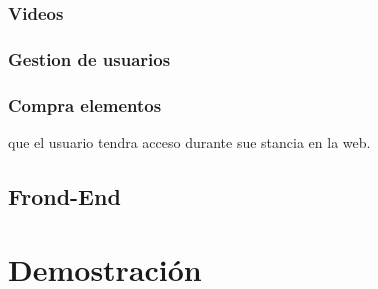 \subsubsection*{Videos}

\subsubsection*{Gestion de usuarios}

\subsubsection*{Compra elementos}


que el usuario tendra acceso durante sue stancia en la web.
\subsection{Frond-End}
\section{Demostración}
